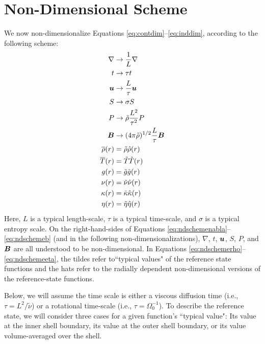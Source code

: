 \documentclass[12pt]{article}
\numberwithin{equation}{section}
\newcommand{\rhond}{\hat{\rho}}
\newcommand{\tmpnd}{\hat{T}}
\newcommand{\gnd}{\hat{g}}
\newcommand{\nund}{\hat{\nu}}
\newcommand{\kappand}{\hat{\kappa}}
\newcommand{\etand}{\hat{\eta}}
\begin{document}
	\section{Non-Dimensional Scheme}
	We now non-dimensionalize Equations \eqref{eq:contdim}--\eqref{eq:inddim}, according to the following scheme:
	\begin{subequations}\label{eq:ndscheme}
	\begin{align}
		\nabla &\rightarrow \frac{1}{L}\nabla\label{eq:ndschemenabla}\\
		t &\rightarrow \tau t\\
		\vecu &\rightarrow \frac{L}{\tau} \vecu\\
		S &\rightarrow \sigma S\\
		P &\rightarrow \tilde{\rho} \frac{L^2}{\tau^2} P\\
		\vecb &\rightarrow (4\pi\tilde{\rho})^{1/2}\frac{L}{\tau} \vecb \label{eq:ndschemeb}\\ 
		\rhoref\ofr &= \tilde{\rho} \rhond\ofr  \label{eq:ndschemerho} \\
		\tmpref\ofr &= \tilde{T} \tmpnd\ofr\\
		g\ofr &= \tilde{g} \gnd\ofr\\
		\nu\ofr &= \tilde{\nu}\nund\ofr\\
		\kappa\ofr &= \tilde{\kappa}\kappand\ofr\\
		\eta\ofr &= \tilde{\eta}\etand\ofr \label{eq:ndschemeeta} 
	\end{align}
	\end{subequations}
	Here, $L$ is a typical length-scale, $\tau$ is a typical time-scale, and $\sigma$ is a typical entropy scale. On the right-hand-sides of Equations \eqref{eq:ndschemenabla}--\eqref{eq:ndschemeb} (and in the following non-dimensionalizations), $\nabla$, $t$, $\bm{u}$, $S$, $P$, and $\bm{B}$ are all understood to be non-dimensional. In Equations \eqref{eq:ndschemerho}--\eqref{eq:ndschemeeta}, the tildes refer to``typical values" of the reference state functions and the hats refer to the radially dependent non-dimensional versions of the reference-state functions. 
	
	Below, we will assume the time scale is either a viscous diffusion time (i.e., $\tau=L^2/\tilde{\nu}$) or a rotational time-scale (i.e., $\tau=\Omega_0^{-1}$). To describe the reference state, we will consider three cases for a given function's ``typical value": Its value at the inner shell boundary, its value at the outer shell boundary, or its value volume-averaged over the shell. 
	
\end{document}
